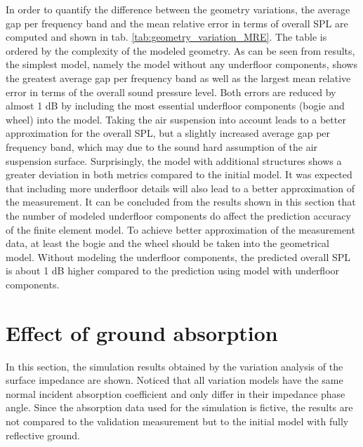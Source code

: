 In order to quantify the difference between the geometry variations, the average gap per frequency band and the mean relative error in terms of overall SPL are computed and shown in tab. \ref{tab:geometry_variation_MRE}. The table is ordered by the complexity of the modeled geometry. As can be seen from results, the simplest model, namely the model without any underfloor components, shows the greatest average gap per frequency band as well as the largest mean relative error in terms of the overall sound pressure level. Both errors are reduced by almost 1 dB by including the most essential underfloor components (bogie and wheel) into the model. Taking the air suspension into account leads to a better approximation for the overall SPL, but a slightly increased average gap per frequency band, which may due to the sound hard assumption of the air suspension surface. Surprisingly, the model with additional structures shows a greater deviation in both metrics  compared to the initial model. It was expected that including more underfloor details will also lead to a better approximation of the measurement. It can be concluded from the results shown in this section that the number of modeled underfloor components do affect the prediction accuracy of the finite element model. To achieve better approximation of the measurement data, at least the bogie and the wheel should be taken into the geometrical model. Without modeling the underfloor components, the predicted overall SPL is about 1 dB higher compared to the prediction using model with underfloor components.

\section{Effect of ground absorption}

In this section, the simulation results obtained by the variation analysis of the surface impedance are shown. Noticed that all variation models have the same normal incident absorption coefficient and only differ in their impedance phase angle. Since the absorption data used for the simulation is fictive, the results are not compared to the validation measurement but to the initial model with fully reflective ground.

